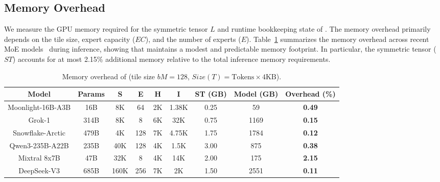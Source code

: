 \subsection{Memory Overhead}\label{sec:eval:memory}
We measure the GPU memory required for the symmetric tensor $L$ and runtime bookkeeping state of \sysname.
The memory overhead primarily depends on the tile size, expert capacity ($EC$), and the number of experts ($E$).
Table~\ref{tab:memory-overhead} summarizes the memory overhead across recent MoE models~\cite{moonlight,grok,snowflake-arctic,qwen3,mixtral,deepseek} during inference, showing that \sysname maintains a modest and predictable memory footprint.
In particular, the symmetric tensor ($ST$) accounts for at most 2.15\% additional memory relative to the total inference memory requirements.
\begin{table}[!ht]
    \centering
    \caption{Memory overhead of \sysname (tile size $bM = 128$, $Size(T) = \text{Tokens} \times 4\text{KB}$).}
    \label{tab:memory-overhead}
    \small
    \setlength{\tabcolsep}{5pt}
    \renewcommand{\arraystretch}{0.9}
    \begin{tabular}{ccccccccc}
        \toprule
        \textbf{Model} & \textbf{Params} & \textbf{S} & \textbf{E} & \textbf{H} & \textbf{I} & \textbf{ST (GB)} & \textbf{Model (GB)} & \textbf{Overhead (\%)} \\
        \midrule
        Moonlight-16B-A3B  & 16B  & 8K   & 64   & 2K   & 1.38K  & 0.25  & 59    & \textbf{0.49} \\
        Grok-1             & 314B & 8K   & 8    & 6K   & 32K     & 0.75  & 1169  & \textbf{0.15} \\
        Snowflake-Arctic   & 479B & 4K   & 128  & 7K   & 4.75K   & 1.75  & 1784  & \textbf{0.12} \\
        Qwen3-235B-A22B    & 235B & 40K  & 128  & 4K   & 1.5K    & 3.00  & 875   & \textbf{0.38} \\
        Mixtral 8x7B       & 47B  & 32K  & 8    & 4K   & 14K     & 2.00  & 175   & \textbf{2.15} \\
        DeepSeek-V3        & 685B & 160K & 256  & 7K   & 2K      & 1.50  & 2551  & \textbf{0.11} \\
        \bottomrule
    \end{tabular}
    \vspace{-0.4cm}
\end{table}